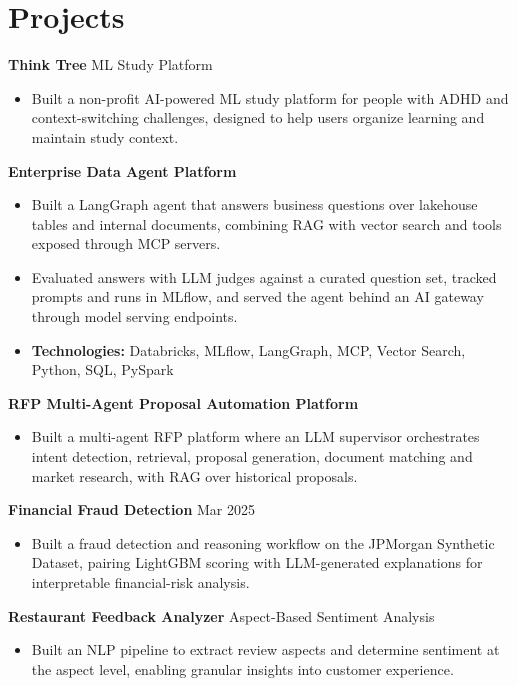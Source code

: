 \documentclass[10pt,a4paper]{article}
\begin{document}
\section{Projects}
\textbf{Think Tree} \textbar{} ML Study Platform\par
\begin{itemize}
  \item Built a non-profit AI-powered ML study platform for people with ADHD and context-switching challenges, designed to help users organize learning and maintain study context.
\end{itemize}
\textbf{Enterprise Data Agent Platform}\par
\begin{itemize}
  \item Built a LangGraph agent that answers business questions over lakehouse tables and internal documents, combining RAG with vector search and tools exposed through MCP servers.
  \item Evaluated answers with LLM judges against a curated question set, tracked prompts and runs in MLflow, and served the agent behind an AI gateway through model serving endpoints.
  \item \textbf{Technologies:} Databricks, MLflow, LangGraph, MCP, Vector Search, Python, SQL, PySpark
\end{itemize}
\textbf{RFP Multi-Agent Proposal Automation Platform}\par
\begin{itemize}
  \item Built a multi-agent RFP platform where an LLM supervisor orchestrates intent detection, retrieval, proposal generation, document matching and market research, with RAG over historical proposals.
\end{itemize}
\textbf{Financial Fraud Detection} \textbar{} Mar 2025\par
\begin{itemize}
  \item Built a fraud detection and reasoning workflow on the JPMorgan Synthetic Dataset, pairing LightGBM scoring with LLM-generated explanations for interpretable financial-risk analysis.
\end{itemize}
\textbf{Restaurant Feedback Analyzer} \textbar{} Aspect-Based Sentiment Analysis\par
\begin{itemize}
  \item Built an NLP pipeline to extract review aspects and determine sentiment at the aspect level, enabling granular insights into customer experience.
\end{itemize}
\end{document}
